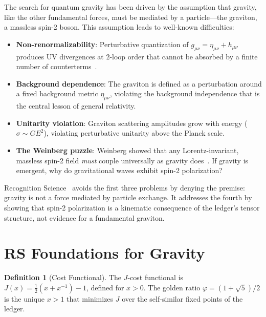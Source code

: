 \documentclass[12pt,a4paper]{article}
\theoremstyle{definition}
\newtheorem{definition}[theorem]{Definition}
\theoremstyle{remark}
\begin{document}
The search for quantum gravity has been driven by the assumption
that gravity, like the other fundamental forces, must be mediated
by a particle---the graviton, a massless spin-2 boson.  This
assumption leads to well-known difficulties:
\begin{itemize}
  \item \textbf{Non-renormalizability}: Perturbative quantization
  of $g_{\mu\nu} = \eta_{\mu\nu} + h_{\mu\nu}$ produces UV
  divergences at 2-loop order that cannot be absorbed by a finite
  number of counterterms~\cite{Goroff1986}.
  \item \textbf{Background dependence}: The graviton is defined
  as a perturbation around a fixed background metric
  $\eta_{\mu\nu}$, violating the background independence that is
  the central lesson of general relativity.
  \item \textbf{Unitarity violation}: Graviton scattering
  amplitudes grow with energy ($\sigma \sim G E^2$), violating
  perturbative unitarity above the Planck scale.
  \item \textbf{The Weinberg puzzle}: Weinberg showed that any
  Lorentz-invariant, massless spin-2 field \emph{must} couple
  universally as gravity does~\cite{Weinberg1965}.  If gravity
  is emergent, why do gravitational waves exhibit spin-2
  polarization?
\end{itemize}

Recognition Science~\cite{RS_Axioms} avoids the first three problems
by denying the premise: gravity is not a force mediated by particle
exchange.
It addresses the fourth by showing that spin-2 polarization is a
kinematic consequence of the ledger's tensor structure, not
evidence for a fundamental graviton.

\section{RS Foundations for Gravity}
\label{sec:foundations}

\begin{definition}[Cost Functional]
\label{def:cost}
The $J$-cost functional is $J(x) = \tfrac{1}{2}(x + x^{-1}) - 1$,
defined for $x > 0$.  The golden ratio $\varphi = (1+\sqrt{5})/2$
is the unique $x > 1$ that minimizes $J$ over the self-similar
fixed points of the ledger.
\end{definition}
\end{document}
